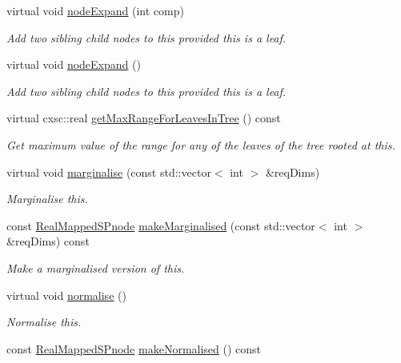 \begin{DoxyCompactItemize}
\item 
virtual void \hyperlink{classsubpavings_1_1RealMappedSPnode_a4d0129dda149a950a06e9d2e3ff802c4}{node\-Expand} (int comp)
\begin{DoxyCompactList}\small\item\em \-Add two sibling child nodes to this provided this is a leaf. \end{DoxyCompactList}\item 
virtual void \hyperlink{classsubpavings_1_1RealMappedSPnode_ad60865bacd8a43978cf2da02419cbf8f}{node\-Expand} ()
\begin{DoxyCompactList}\small\item\em \-Add two sibling child nodes to this provided this is a leaf. \end{DoxyCompactList}\item 
virtual cxsc\-::real \hyperlink{classsubpavings_1_1RealMappedSPnode_abae5bea82b46019e23d98756973c6860}{get\-Max\-Range\-For\-Leaves\-In\-Tree} () const 
\begin{DoxyCompactList}\small\item\em \-Get maximum value of the range for any of the leaves of the tree rooted at this. \end{DoxyCompactList}\item 
virtual void \hyperlink{classsubpavings_1_1RealMappedSPnode_acf2399376e990903e5787b0a68eb350c}{marginalise} (const std\-::vector$<$ int $>$ \&req\-Dims)
\begin{DoxyCompactList}\small\item\em \-Marginalise this. \end{DoxyCompactList}\item 
const \hyperlink{classsubpavings_1_1RealMappedSPnode}{\-Real\-Mapped\-S\-Pnode} \hyperlink{classsubpavings_1_1RealMappedSPnode_ab3ac1ccd24132d04f136a0fab3d0b610}{make\-Marginalised} (const std\-::vector$<$ int $>$ \&req\-Dims) const 
\begin{DoxyCompactList}\small\item\em \-Make a marginalised version of this. \end{DoxyCompactList}\item 
virtual void \hyperlink{classsubpavings_1_1RealMappedSPnode_a8b02632446a3c28a352f15f511e35caa}{normalise} ()
\begin{DoxyCompactList}\small\item\em \-Normalise this. \end{DoxyCompactList}\item 
const \hyperlink{classsubpavings_1_1RealMappedSPnode}{\-Real\-Mapped\-S\-Pnode} \hyperlink{classsubpavings_1_1RealMappedSPnode_a66a8b6deef3ba770a80a5b0b0418f5fc}{make\-Normalised} () const 

\end{DoxyCompactItemize}
